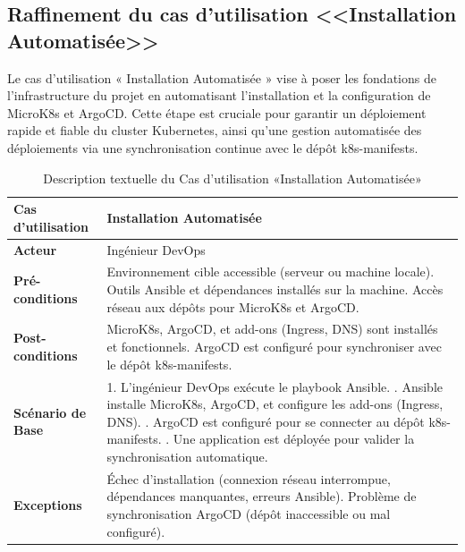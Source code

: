 \subsection{Raffinement du cas d'utilisation <<Installation Automatisée>>}
Le cas d’utilisation « Installation Automatisée » vise à poser les fondations de l’infrastructure du projet en automatisant l’installation et la configuration de MicroK8s et ArgoCD. Cette étape est cruciale pour garantir un déploiement rapide et fiable du cluster Kubernetes, ainsi qu’une gestion automatisée des déploiements via une synchronisation continue avec le dépôt k8s-manifests.
\begin{table}[!ht]
      \centering
      \caption{Description textuelle du Cas d’utilisation «Installation Automatisée»}
      \label{tab:installation_automatisee}
      \renewcommand{\arraystretch}{1.2}
      \begin{tabular}{|p{4.2cm}|p{11cm}|}
      \hline
      \textbf{Cas d'utilisation} & Installation Automatisée \\
      \hline
      \textbf{Acteur} & Ingénieur DevOps \\
      \hline
      \textbf{Pré-conditions} & Environnement cible accessible (serveur ou machine locale). \newline Outils Ansible et dépendances installés sur la machine. \newline Accès réseau aux dépôts pour MicroK8s et ArgoCD. \\
      \hline
      \textbf{Post-conditions} & MicroK8s, ArgoCD, et add-ons (Ingress, DNS) sont installés et fonctionnels. \newline ArgoCD est configuré pour synchroniser avec le dépôt k8s-manifests. \\
      \hline
      \textbf{Scénario de Base} & 
      1. L’ingénieur DevOps exécute le playbook Ansible. \newline
      2. Ansible installe MicroK8s, ArgoCD, et configure les add-ons (Ingress, DNS). \newline
      3. ArgoCD est configuré pour se connecter au dépôt k8s-manifests. \newline
      4. Une application est déployée pour valider la synchronisation automatique. \\
      \hline
      \textbf{Exceptions} & 
      Échec d’installation (connexion réseau interrompue, dépendances manquantes, erreurs Ansible). \newline Problème de synchronisation ArgoCD (dépôt inaccessible ou mal configuré). \\
      \hline
      \end{tabular}
  \end{table}
